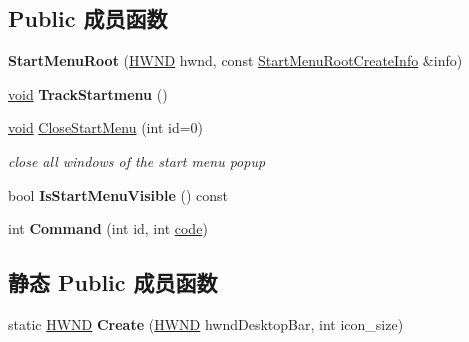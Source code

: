 \subsection*{Public 成员函数}
\begin{DoxyCompactItemize}
\item 
\mbox{\label{struct_start_menu_root_ad9d007308b49419a786221085a663ded}} 
{\bfseries Start\+Menu\+Root} (\hyperlink{interfacevoid}{H\+W\+ND} hwnd, const \hyperlink{struct_start_menu_root_create_info}{Start\+Menu\+Root\+Create\+Info} \&info)
\item 
\mbox{\label{struct_start_menu_root_ae258289bc80b3e51274072b9b8eedf74}} 
\hyperlink{interfacevoid}{void} {\bfseries Track\+Startmenu} ()
\item 
\mbox{\label{struct_start_menu_root_a3747075a2b8c0c041a2fe1dc3adabf9e}} 
\hyperlink{interfacevoid}{void} \hyperlink{struct_start_menu_root_a3747075a2b8c0c041a2fe1dc3adabf9e}{Close\+Start\+Menu} (int id=0)
\begin{DoxyCompactList}\small\item\em close all windows of the start menu popup \end{DoxyCompactList}\item 
\mbox{\label{struct_start_menu_root_a88f2fadb59a607bad32b86537fe3d8c1}} 
bool {\bfseries Is\+Start\+Menu\+Visible} () const
\item 
\mbox{\label{struct_start_menu_root_abfaddc7059198d9b5dc222e7eae1931f}} 
int {\bfseries Command} (int id, int \hyperlink{structcode}{code})
\end{DoxyCompactItemize}
\subsection*{静态 Public 成员函数}
\begin{DoxyCompactItemize}
\item 
\mbox{\label{struct_start_menu_root_a239cfdf354a1d98b7c26dddb1315298a}} 
static \hyperlink{interfacevoid}{H\+W\+ND} {\bfseries Create} (\hyperlink{interfacevoid}{H\+W\+ND} hwnd\+Desktop\+Bar, int icon\+\_\+size)
\end{DoxyCompactItemize}
